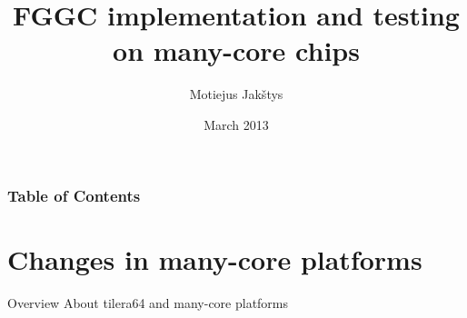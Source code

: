 \documentclass{beamer}
\title{FGGC implementation and testing on many-core chips}
\author{Motiejus Jak\v{s}tys}
\date{March 2013}
\begin{document}
\begin{frame}[plain]
    \titlepage
\end{frame}

\begin{frame}
    \frametitle{Table of Contents}
    \tableofcontents[currentsection]
\end{frame}

\section{Changes in many-core platforms}

\begin{frame}{Overview}
    About tilera64 and many-core platforms
\end{frame}
\end{document}
